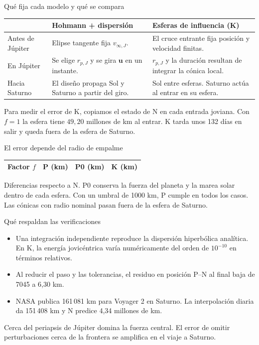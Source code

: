 \documentclass[aspectratio=169,11pt]{beamer}
\begin{document}
\begin{frame}{Qué fija cada modelo y qué se compara}
\small
\begin{tabular}{@{}p{.18\linewidth}p{.37\linewidth}p{.36\linewidth}@{}}
\toprule
& Hohmann + dispersión & Esferas de influencia (K)\\
\midrule
Antes de Júpiter & Elipse tangente fija $v_{\infty,J}$. & El cruce entrante fija posición y velocidad finitas.\\[3pt]
En Júpiter & Se elige $r_{p,J}$ y se gira $\mathbf u$ en un instante. & $r_{p,J}$ y la duración resultan de integrar la cónica local.\\[3pt]
Hacia Saturno & El diseño propaga Sol y Saturno a partir del giro. & Sol entre esferas. Saturno actúa al entrar en su esfera.\\
\bottomrule
\end{tabular}
\medskip

Para medir el error de K, copiamos el estado de N en cada entrada joviana. Con $f=1$ la esfera tiene $49{,}20$ millones de km al entrar. K tarda unos 132 días en salir y queda fuera de la esfera de Saturno.
\end{frame}

\begin{frame}{El error depende del radio de empalme}
\centering
\begin{tabular}{rrrr}
\toprule
Factor $f$ & P (km) & P0 (km) & K (km)\\
\midrule

\end{tabular}
\par\medskip
\raggedright
Diferencias respecto a N. P0 conserva la fuerza del planeta y la marea solar dentro de cada esfera. Con un umbral de 1000 km, P cumple en todos los casos. Las cónicas con radio nominal pasan fuera de la esfera de Saturno.
\end{frame}

\begin{frame}{Qué respaldan las verificaciones}
\begin{itemize}
\item Una integración independiente reproduce la dispersión hiperbólica analítica. En K, la energía jovicéntrica varía numéricamente del orden de $10^{-10}$ en términos relativos.
\item Al reducir el paso y las tolerancias, el residuo en posición P--N al final baja de 7045 a 6,30 km.
\item NASA publica 161\,081 km para Voyager 2 en Saturno. La interpolación diaria da 151\,408 km y N predice 4,34 millones de km.
\end{itemize}
\medskip
Cerca del periapsis de Júpiter domina la fuerza central. El error de omitir perturbaciones cerca de la frontera se amplifica en el viaje a Saturno.
\end{frame}
\end{document}
